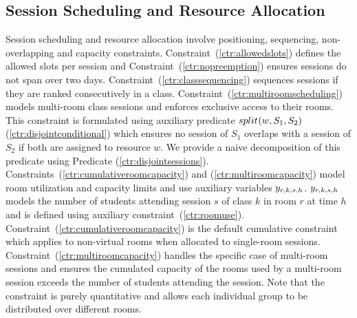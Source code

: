 \subsection{Session Scheduling and Resource Allocation}
\label{sec:model-scheduling}

Session scheduling and resource allocation involve positioning, sequencing, non-overlapping and capacity constraints. 
Constraint~(\ref{ctr:allowedslots}) defines the allowed slots per session
and 
Constraint~(\ref{ctr:nopreemption}) ensures sessions do not span over two days.
Constraint~(\ref{ctr:classsequencing}) sequences sessions if they are ranked consecutively in  a class.
Constraint~(\ref{ctr:multiroomscheduling}) models multi-room class sessions and enforces exclusive access to their rooms. 
This constraint is formulated using auxiliary predicate $split^{}_{}(w,S_1,S_2)$ (\ref{ctr:disjointconditional})
which ensures no session of $S_1$ overlaps with a session of $S_2$ if both are assigned to resource $w$. 
We provide a naive decomposition of this predicate using Predicate (\ref{ctr:disjointsessions}).
Constraints~(\ref{ctr:cumulativeroomcapacity}) and (\ref{ctr:multiroomcapacity}) model room utilization and capacity limits and use auxiliary variables $y_{r,k,s,h}$.
$y_{r,k,s,h}$ models the number of students attending session $s$ of class $k$ in room $r$ at time $h$  and is defined using auxiliary constraint~(\ref{ctr:roomuse}).
Constraint~(\ref{ctr:cumulativeroomcapacity}) is the default cumulative constraint which applies to non-virtual rooms when allocated to single-room sessions.
Constraint~(\ref{ctr:multiroomcapacity})
handles the specific case of multi-room sessions and ensures the cumulated capacity of the rooms used by a multi-room session exceeds the number of students attending the session.
Note that the constraint is purely quantitative and allows each individual group to be distributed over different rooms.


